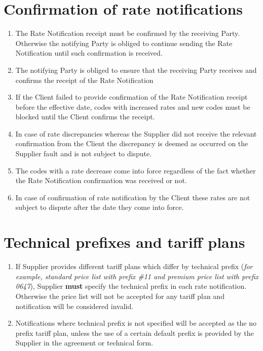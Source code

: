 \begin{Form}
  \section{Confirmation of rate notifications} \label{sec:confirmation-en}
    \begin{enumerate}[label=\thesection.\arabic*.]
      \item The Rate Notification receipt must be confirmed by the receiving Party.
           Otherwise the notifying Party is obliged to continue sending the Rate Notification
           until such confirmation is received.
      \item The notifying Party is obliged to ensure that the receiving Party receives and confirms
           the receipt of the Rate Notification
      \item If the Client failed to provide confirmation of the Rate Notification receipt before
            the effective date, codes with increased rates and new codes must be blocked until
            the Client confirms the receipt.
      \item In case of rate discrepancies whereas the Supplier did not receive the relevant
            confirmation from the Client the discrepancy is deemed as occurred on the Supplier
            fault and is not subject to dispute.
      \item The codes with a rate decrease come into force regardless of the fact whether
            the Rate Notification confirmation was received or not.
      \item In case of confirmation of rate notification by the Client these rates are not
            subject to dispute after the date they come into force.
    \end{enumerate}
    
  \section{Technical prefixes and tariff plans}

  \begin{enumerate}[label=\thesection.\arabic*.]
     \item If Supplier provides different tariff plans which differ by technical
          prefix (\textit{for example, standard price list with prefix \#11 and premium
          price list with prefix 0647}), Supplier \textbf{must} specify the
          technical prefix in each rate notification. Otherwise the price list will
          not be accepted for any tariff plan and notification will be considered invalid.
      \item Notifications where technical prefix is not specified will be accepted as the
            \flqq{}no prefix\frqq{} tariff plan, unless the use of a certain default prefix
            is provided by the Supplier in the agreement or technical form.
    \end{enumerate}


\end{Form}
